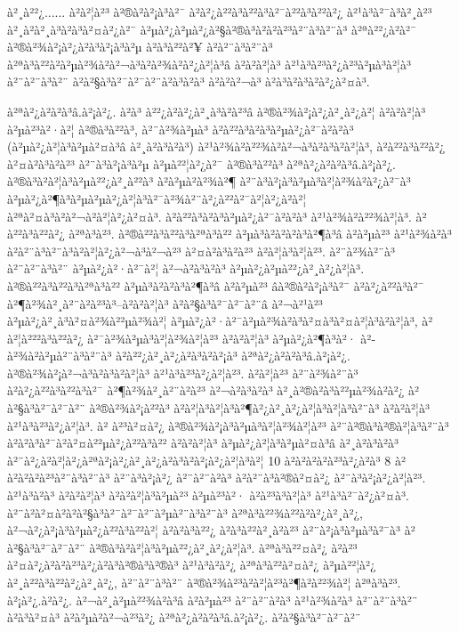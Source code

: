 à²¸à²²¿...... à²à²¦à²³ à²®à²à²¡à³à²¯ à²à²¿à²²à³à²²à³à²¯à²²à³à²²à²¿ à²¹à³à²¯à³à²¸à²³ à²¸à²à²¸à³à²à³à²¤à²¿à²¯ à²µà²¿à²µà²¿à²§à²®à³à²à²à²³à²¨à³à²¨à³ à²ªà²²¿à²à²¯ à²®à²¾à²¡à²¿à²à³à²¡à³à²µ à²à³à²²à²¥ à²à²¨à³à²¨à³ à²ªà³à²²à²à²µà²¾à²à²¬à³à²à²¾à²à²¿à²¦à³â à²à²à²¦à³ à²¹à³à²³à²¿à²³à²µà³à²¦à³ à²¨à²¨à³à²¨ à²à²§à³à²¯à²¯à²¨à²à³à²à³ à²à²à²¬à³ à²à³à²à³à²à²¿à²¤à³. 

à²ªà²¿à²à²à³â.à²¡à²¿. à²à³ à²²¿à²à²¿à²¸à³à²à²³â à²®à²¾à²¡à²¿à²¸à²¿à²¦ à²à²à²¦à³ à²µà²³à²·à²¦ à²®à³à²²à³, à²¨à²¾à²µà³ à²à²²à³à²à³à²µà²¿à²¯à²à²à³ (à²µà²¿à²¦à³à²µà²¤à³â à²¸à²­à³à²à³) à²¹à²¾à²à²²¾à²à²¬à³à²à³à²à²¦à³, à²à²²à³à²²à²¿ à²¤à²à³à²à²³ à²¨à³à²¡à³à²µ à²µà²²¦à²¿à²¯ à²®à³à²²à³ à²ªà²¿à²à²à³â.à²¡à²¿. à²®à³à²à²¦à³à²µà²²¿à²¸à²²à³ à²à²µà²à²¾à²¶ à²¨à³à²¡à³à²µà³à²¦à²¾à²à²¿à²¯à³ à²µà²¿à²¶à³à²µà²µà²¿à²¦à³à²¯à²¾à²¨à²¿à²²à²¯à²¦à²¿à²à²¦ à²ªà²¤à³à²\circ à²¬à²à²¦à²¿à²¤à³. à²à²²à³à²à³à²µà²¿à²¯à²à²à³ à²¹à²¾à²à²²¾à²¦à³. à²à²²à³à²²à²¿ à²ªà³à²³. à²®à²²à³à²²à³à²ªà³à²² à²µà³à²à²à²à³à²¶à³â à²à²µà²³ à²¹à²¾à²à³ à²à²¨à³à²¨à³à²à²¦à²¿à²¬à³à²¬à²³ à²¤à²à³à²à²³ à²à²¦à³à²¦à²³. à²¨à²¾à²¨à³ à²¨à²¨à³à²¨ à²µà²¿à²·à²¯à²¦ à²¬à²à³à²à³ à²µà²¿à²µà²²¿à²¸à²¿à²¦à³. à²®à²²à³à²²à³à²ªà³à²² à²µà³à²à²à³à²¶à³â à²à²µà²³ âà²®à²à²¡à³à²¯ à²à²¿à²²à³à²¯ à²¶à²¾à²¸à²¨à²à²³à³–à²à²à²¦à³ à²à²§à³à²¯à²¯à²¨â à²¬à²¹à²³ à²µà²¿à²¸à³à²¤à²¾à²²µà²¾à²¦ à²µà²¿à²·à²¯à²µà²¾à²à³à²¤à³à²¤à²¦à³à²à²¦à³, à²à²¦à²²²à³à²²à²¿ à²¯à²¾à²µà³à²¦à²¾à²¦à²³ à²à²à²¦à³ à²µà²¿à²¶à³à²· à²­à²¾à²à²µà²¨à³à²¨à³ à²à²²¿à²¸à²¿à²à³à²à²¡à³ à²ªà²¿à²à²à³â.à²¡à²¿. à²®à²¾à²¡à²¬à³à²à³à²à²¦à³ à²¹à³à²³à²¿à²¦à²³. à²à²¦à²³ à²¨à²¾à²¨à³ à²à²¿à²²à³à²²à³à²¯ à²¶à²¾à²¸à²¨à²à²³ à²¬à²à³à²à³ à²¸à²®à²à³à²²µà²¾à²à²¿ à²à²§à³à²¯à²¯à²¨ à²®à²¾à²¡à²²à³ à²à²¦à³à²¦à³à²¶à²¿à²¸à²¿à²¦à³à²¦à³à²¨à³ à²à²à²¦à³ à²¹à³à²³à²¿à²¦à³. à² à²³à²¤à²¿ à²®à²¾à²¡à³à²µà³à²¦à²¾à²¦à²³ à²¨à²®à³à²®à²¦à³à²¨à³ à²à²­à³à²¯à²à²¤à²²µà²¿à²²à³à²² à²à²à²¦à³ à²µà²¿à²¦à³à²µà²¤à³â à²¸à²­à³à²à³ à²¨à²¿à²à²¦à²¿à²ªà²¡à²¿à²¸à²¿à²à³à²à²¡à²¿à²¦à³à²¦ 10 à²à²à²à²à²³à²¿à²à³ 8 à²à²à²à²à²³à²¨à³à²¨à³ à²¨à³à²¡à²¿ à²¨à²¨à²à³ à²à²¨à³à²®à²¤à²¿ à²¨à³à²¡à²¿à²¦à²³. à²¹à³à²à³ à²à²à²¦à³ à²à²à²¦à³à²µà²³ à²µà²³à²· à²à²³à³à²¦à³ à²¹à³à²¯à²¿à²¤à³. à²¨à²à²¤à²\circ à²à²§à³à²¯à²¯à²¨à²µà²¨à³à²¨à³ à²ªà³à²²¾à²²à²­à²¿à²¸à²¿, à²¬à²¿à²¡à³à²µà²¿à²²à³à²²à²¦ à²à²à³à²²¿ à²à³à²²à²¸à²à²³ à²¨à²¡à³à²µà³à²¯à³ à²à²§à³à²¯à²¯à²¨ à²®à³à²à²¦à³à²µà²²¿à²¸à²¿à²¦à³. à²ªà³à²²¤à²¿ à²à²³ à²¤à²¿à²à²à²³à²¿à²à³à²®à³à²®à³ à²¹à³à²à²¿ à²ªà³à²²à²¤à²¿ à²µà²²¦à²¿ à²¸à²²à³à²²à²¿à²¸à²¿, à²¨à²¨à³à²¨ à²®à²¾à²³à²à²¦à²³à²¶à²à²²¾à²¦ à²ªà³à²³. à²¡à²¿.à²à²¿. à²¬à²¸à²µà²²¾à²à³â à²à²µà²³ à²¨à²¨à²à³ à²¹à²¾à²à³ à²¨à²¨à³à²¨ à²à³à²¤à³ à²à²µà²\circ à²¬à²³à²¿ à²ªà²¿à²à²à³â.à²¡à²¿. à²à²§à³à²¯à²¯à²¨ 